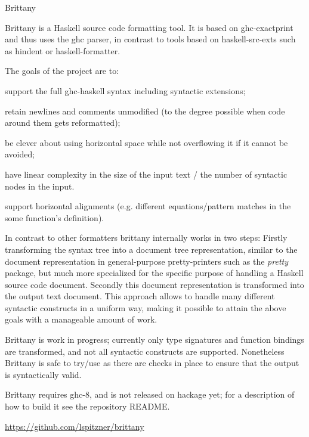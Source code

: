 \begin{hcarentry}[new]{Brittany}
\makeheader

Brittany is a Haskell source code formatting tool. It is based on
ghc-exactprint and thus uses the ghc parser, in contrast to tools based on
haskell-src-exts such as hindent or haskell-formatter.

The goals of the project are to:

\begin{compactitem}
\item
  support the full ghc-haskell syntax including syntactic extensions;
\item
  retain newlines and comments unmodified (to the degree possible when code
  around them gets reformatted);
\item
  be clever about using horizontal space while not overflowing it if it cannot
  be avoided;
\item
  have linear complexity in the size of the input text / the number of
  syntactic nodes in the input.
\item
  support horizontal alignments (e.g. different equations/pattern matches in
  the some function's definition).
\end{compactitem}

In contrast to other formatters brittany internally works in two steps: Firstly
transforming the syntax tree into a document tree representation, similar to
the document representation in general-purpose pretty-printers such as the
\emph{pretty} package, but much more specialized for the specific purpose of
handling a Haskell source code document. Secondly this document representation
is transformed into the output text document. This approach allows to handle
many different syntactic constructs in a uniform way, making it possible
to attain the above goals with a manageable amount of work.

Brittany is work in progress; currently only type signatures and function
bindings are transformed, and not all syntactic constructs are supported.
Nonetheless Brittany is safe to try/use as there are checks in place to
ensure that the output is syntactically valid.

Brittany requires ghc-8, and is not released on hackage yet; for a description
of how to build it see the repository README.

\FurtherReading
{\small
\begin{compactitem}
  \item
    \url{https://github.com/lspitzner/brittany}
\end{compactitem}
}
\end{hcarentry}
